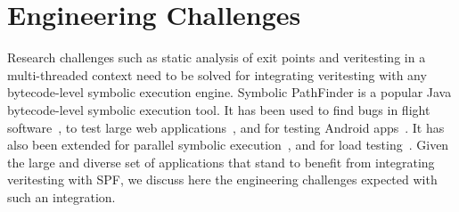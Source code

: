 \section{Engineering Challenges}
Research challenges such as static analysis of exit points and veritesting in a multi-threaded context need to be solved for integrating veritesting with any bytecode-level symbolic execution engine.
%
Symbolic PathFinder is a popular Java bytecode-level symbolic execution tool.
%
It has been used to find bugs in flight software~\cite{pasareanu2008}, to test large web applications~\cite{fujitsu}, and for testing Android apps~\cite{android_spf}.
%
It has also been extended for parallel symbolic execution~\cite{parallel}, and for load testing~\cite{load_testing_spf}.
%
Given the large and diverse set of applications that stand to benefit from integrating veritesting with SPF, we discuss here the engineering challenges expected with such an integration.

